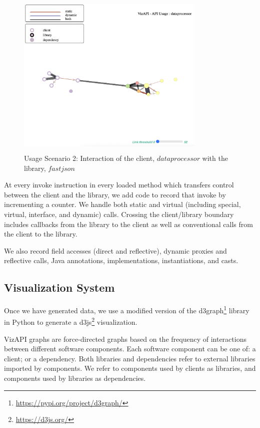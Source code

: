 \begin{figure}[t]
\begin{center}
\includegraphics[scale=1,width=9cm,height=8cm]{images/usage-scenario2.png}
\caption{Usage Scenario 2: Interaction of the client, $dataprocessor$ with the library, $fastjson$}
\label{fig:usagescenario2}
\end{center}
\end{figure}

At every invoke instruction in every
loaded method which transfers control between the client and the
library, we add code to record that invoke by incrementing a counter.
We handle both static and virtual (including special, virtual,
interface, and dynamic) calls. Crossing the client/library boundary
includes callbacks from the library to the client as well as conventional
calls from the client to the library. 

We also record field accesses (direct and reflective), dynamic proxies
and reflective calls, Java annotations, implementations,
instantiations, and casts.

\subsection{Visualization System}
\label{subsec:vis-system}

Once we have generated data, we use a modified version
of the d3graph\footnote{\url{https://pypi.org/project/d3graph/}} library in Python to generate a d3js\footnote{\url{https://d3js.org/}}
visualization. 

VizAPI graphs are force-directed graphs based on the
frequency of interactions between different software components. 
Each software component can be one of: a client; or a dependency.
Both libraries and dependencies refer to external libraries imported by components.
We refer to components used by clients as libraries, and components used by libraries
as dependencies. 

